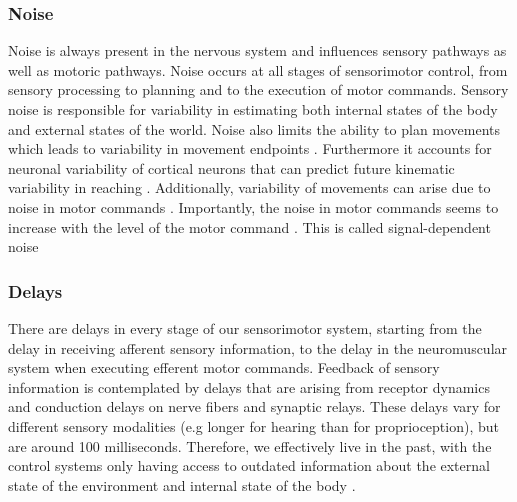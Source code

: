 \documentclass{SeminarV2}
\begin{document}
\subsubsection{Noise}
Noise is always present in the nervous system and influences sensory pathways as well as motoric pathways\cite{faisal2008noise}. Noise occurs at all stages of sensorimotor control,
from sensory processing to planning and to the execution of motor commands. Sensory noise is responsible for variability in estimating both internal states of the body and external states of the world. Noise also limits the ability to plan movements which leads 
to variability in movement endpoints \cite{gordon1994accuracy} \cite{vindras1998frames}. Furthermore it accounts for neuronal variability of
cortical neurons that can predict future kinematic variability in
reaching \cite{churchland2006central}. Additionally, variability of movements
can arise due to noise in motor commands \cite{van2009motor}. Importantly, the noise in motor commands seems to
increase with the level of the motor command \cite{jones2002sources} \cite{slifkin1999noise}. This is called signal-dependent noise
\subsubsection{Delays}
There are delays in every stage of our sensorimotor system, starting from the
delay in receiving afferent sensory information, to the delay in the neuromuscular system when executing efferent motor commands. Feedback of sensory information is contemplated by delays that are arising from receptor dynamics and conduction delays on nerve fibers and synaptic relays. These delays vary for different sensory modalities (e.g longer for hearing than for proprioception), but are around 100 milliseconds.
 Therefore, we effectively live in the
past, with the control systems only having access to outdated information about the external state of the environment  and internal state of the body \cite{franklin2011computational}.
\end{document}

